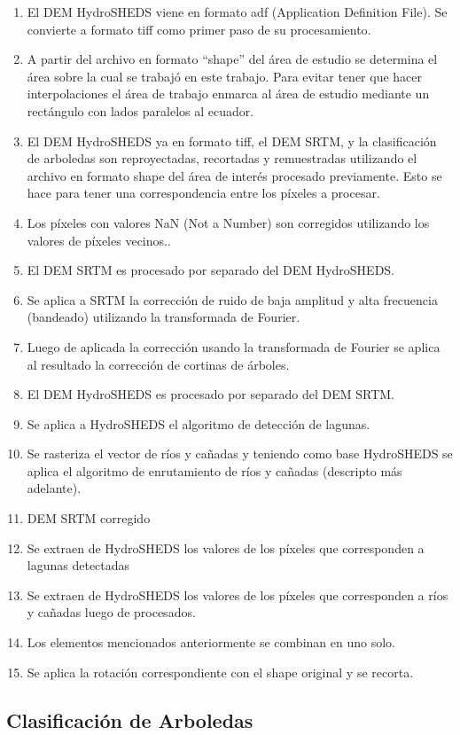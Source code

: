 \documentclass[10pt,a4paper, twoside]{report}
\begin{document}
\begin{enumerate}
	\item El DEM HydroSHEDS viene en formato adf (Application Definition File). Se convierte a formato tiff como primer paso de su procesamiento.
	\item A partir del archivo en formato "`shape"' del área de estudio se determina el área sobre la cual se trabajó en este trabajo. Para evitar tener que hacer interpolaciones el área de trabajo enmarca al área de estudio mediante un rectángulo con lados paralelos al ecuador.	
	\item El DEM HydroSHEDS ya en formato tiff, el DEM SRTM, y la clasificación de arboledas son reproyectadas, recortadas y remuestradas utilizando el archivo en formato shape del área de interés procesado previamente. Esto se hace para tener una correspondencia entre los píxeles a procesar.
	\item Los píxeles con valores NaN (Not a Number) son corregidos utilizando los valores de píxeles vecinos..
	\item El DEM SRTM es procesado por separado del DEM HydroSHEDS.
	\item Se aplica a SRTM la corrección de ruido de baja amplitud y alta frecuencia (bandeado) utilizando la transformada de Fourier.
	\item Luego de aplicada la corrección usando la transformada de Fourier se aplica al resultado la corrección de cortinas de árboles.
	\item El DEM HydroSHEDS es procesado por separado del DEM SRTM.
	\item Se aplica a HydroSHEDS el algoritmo de detección de lagunas.
	\item Se rasteriza el vector de ríos y cañadas y teniendo como base HydroSHEDS se aplica el algoritmo de enrutamiento de ríos y cañadas (descripto más adelante).
	\item DEM SRTM corregido
	\item Se extraen de HydroSHEDS los valores de los píxeles que corresponden a lagunas detectadas
	\item Se extraen de HydroSHEDS los valores de los píxeles que corresponden a ríos y cañadas luego de procesados.
	\item Los elementos mencionados anteriormente se combinan en uno solo.
	\item Se aplica la rotación correspondiente con el shape original y se recorta.	
\end{enumerate}

\subsection{Clasificación de Arboledas}
\label{clasificacionArboledas}
\end{document}
